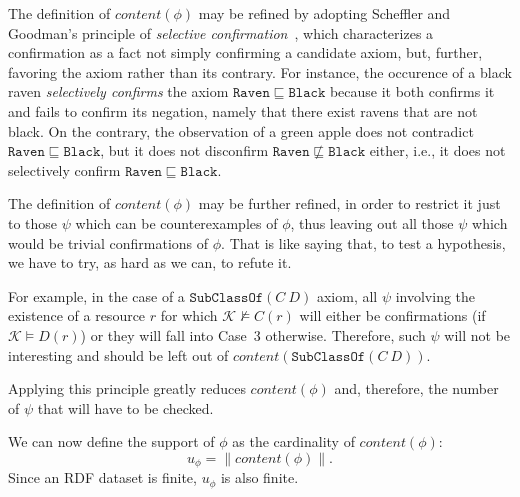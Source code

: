 \documentclass{sig-alternate}
\newcommand{\todo}[1]{\par\framebox{\parbox{3in}{#1}}\par}
\begin{document}
The definition of $content(\phi)$ may be refined by adopting Scheffler and Goodman's principle of
\emph{selective confirmation}~\cite{SchefflerGoodman1972},
which characterizes a confirmation as a fact not simply confirming a candidate axiom, but, further,
favoring the axiom rather than its contrary.
For instance, the occurence of a black raven \emph{selectively confirms} the axiom
$\mathtt{Raven} \sqsubseteq \mathtt{Black}$ because it both confirms it and fails to confirm its
negation, namely that there exist ravens that are not black. On the contrary, the observation of
a green apple does not contradict $\mathtt{Raven} \sqsubseteq \mathtt{Black}$,
but it does not disconfirm $\mathtt{Raven} \not\sqsubseteq \mathtt{Black}$
either, i.e., it does not selectively confirm $\mathtt{Raven} \sqsubseteq \mathtt{Black}$.


The definition of $content(\phi)$ may be further refined, in order to restrict it
just to those $\psi$ which can be counterexamples of $\phi$,
thus leaving out all those $\psi$ which would be trivial confirmations of $\phi$.
That is like saying that, to test a hypothesis, we have to try, as hard as we can,
to refute it.

For example, in the case of a $\mathtt{SubClassOf}(C\ D)$ axiom,
all $\psi$ involving the existence of a resource $r$ for which $\mathcal{K} \not\models C(r)$
will either be confirmations (if $\mathcal{K} \models D(r)$) or they
will fall into Case~3 otherwise. Therefore, such $\psi$ will not be interesting
and should be left out of $content(\mathtt{SubClassOf}(C\ D))$.



Applying this principle greatly reduces $content(\phi)$ and, therefore,
the number of $\psi$ that will have to be checked.



We can now define the support of $\phi$ as the cardinality of $content(\phi)$:
\begin{equation}\label{eq:support}
    u_\phi = \|content(\phi)\|.
\end{equation}
Since an RDF dataset is finite, $u_\phi$ is also finite.
\end{document}
